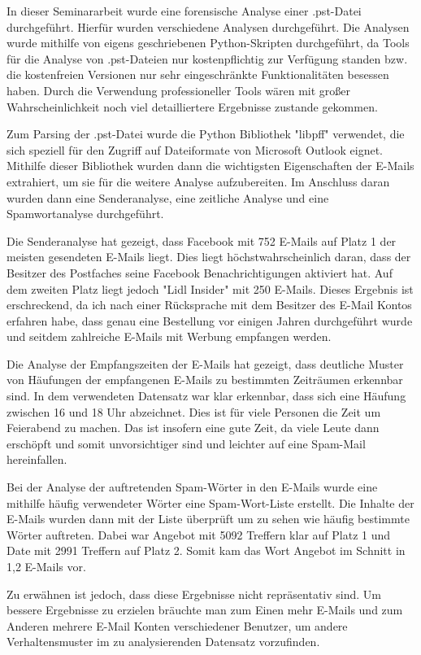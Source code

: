 In dieser Seminararbeit wurde eine forensische Analyse einer .pst-Datei durchgeführt. Hierfür wurden verschiedene Analysen durchgeführt. Die Analysen wurde mithilfe von eigens geschriebenen Python-Skripten durchgeführt, da Tools für die Analyse von .pst-Dateien nur kostenpflichtig zur Verfügung standen bzw. die kostenfreien Versionen nur sehr eingeschränkte Funktionalitäten besessen haben. Durch die Verwendung professioneller Tools wären mit großer Wahrscheinlichkeit noch viel detailliertere Ergebnisse zustande gekommen. \newline

Zum Parsing der .pst-Datei wurde die Python Bibliothek "libpff" verwendet, die sich speziell für den Zugriff auf Dateiformate von Microsoft Outlook eignet. Mithilfe dieser Bibliothek wurden dann die wichtigsten Eigenschaften der E-Mails extrahiert, um sie für die weitere Analyse aufzubereiten. Im Anschluss daran wurden dann eine Senderanalyse, eine zeitliche Analyse und eine Spamwortanalyse durchgeführt. \newline

Die Senderanalyse hat gezeigt, dass Facebook mit 752 E-Mails auf Platz 1 der meisten gesendeten E-Mails liegt. Dies liegt höchstwahrscheinlich daran, dass der Besitzer des Postfaches seine Facebook Benachrichtigungen aktiviert hat. Auf dem zweiten Platz liegt jedoch "Lidl Insider" mit 250 E-Mails. Dieses Ergebnis ist erschreckend, da ich nach einer Rücksprache mit dem Besitzer des E-Mail Kontos erfahren habe, dass genau eine Bestellung vor einigen Jahren durchgeführt wurde und seitdem zahlreiche E-Mails mit Werbung empfangen werden. \newline

Die Analyse der Empfangszeiten der E-Mails hat gezeigt, dass deutliche Muster von Häufungen der empfangenen E-Mails zu bestimmten Zeiträumen erkennbar sind. In dem verwendeten Datensatz war klar erkennbar, dass sich eine Häufung zwischen 16 und 18 Uhr abzeichnet. Dies ist für viele Personen die Zeit um Feierabend zu machen. Das ist insofern eine gute Zeit, da viele Leute dann erschöpft und somit unvorsichtiger sind und leichter auf eine Spam-Mail hereinfallen. \newline

Bei der Analyse der auftretenden Spam-Wörter in den E-Mails wurde eine mithilfe häufig verwendeter Wörter eine \glqq{}Spam-Wort-Liste\grqq{} erstellt. Die Inhalte der E-Mails wurden dann mit der Liste überprüft um zu sehen wie häufig bestimmte Wörter auftreten. Dabei war \glqq{}Angebot\grqq{} mit 5092 Treffern klar auf Platz 1 und \glqq{}Date\grqq{} mit 2991 Treffern auf Platz 2. Somit kam das Wort Angebot im Schnitt in 1,2 E-Mails vor. \newline

Zu erwähnen ist jedoch, dass diese Ergebnisse nicht repräsentativ sind. Um bessere Ergebnisse zu erzielen bräuchte man zum Einen mehr E-Mails und zum Anderen mehrere E-Mail Konten verschiedener Benutzer, um andere Verhaltensmuster im zu analysierenden Datensatz vorzufinden.\newpage